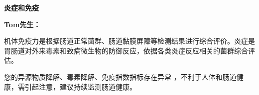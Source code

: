 

\usepackage{graphicx}
\graphicspath{{cores/}}



\setlength{\arrayrulewidth}{0.5pt}
\fontsize{9.3pt}{17pt}\selectfont
\color{gray2}

\vspace*{0mm}
\begin{center}
{\bf\sanhao 炎症和免疫}
\end{center}

\medskip

\noindent
{\bf\xiaosihao Tom先生：}

\bigskip

机体免疫力是根据肠道正常菌群、肠道黏膜屏障等检测结果进行综合评价。炎症是胃肠道对外来毒素和致病微生物的防御反应，依据各类炎症反应相关的菌群综合评估。

您的异源物质降解、毒素降解、免疫指数指标存在异常
，不利于人体和肠道健康，需引起注意，建议持续监测肠道健康。

